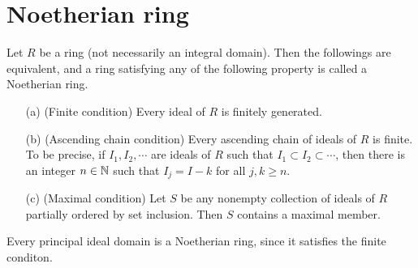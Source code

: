 \section{Noetherian ring}

\begin{defi}
    Let $R$ be a ring (not necessarily an integral domain).
    Then the followings are equivalent, and a ring satisfying any of the following property is called a Noetherian ring.
    \begin{enumerate}
        \item[(a)]
        {
            (Finite condition)
            Every ideal of $R$ is finitely generated.
        }
        \item[(b)]
        {
            (Ascending chain condition)
            Every ascending chain of ideals of $R$ is finite.
            To be precise, if $I_1, I_2, \cdots$ are ideals of $R$ such that $I_1\subset I_2\subset\cdots$, then there is an integer $n\in{\mathbb{N}}$ such that $I_j=I-k$ for all $j, k\geq n$.
        }
        \item[(c)]
        {
            (Maximal condition)
            Let $S$ be any nonempty collection of ideals of $R$ partially ordered by set inclusion.
            Then $S$ contains a maximal member.
        }
    \end{enumerate}
\end{defi}
\begin{rmk}
    Every principal ideal domain is a Noetherian ring, since it satisfies the finite conditon.
\end{rmk}
